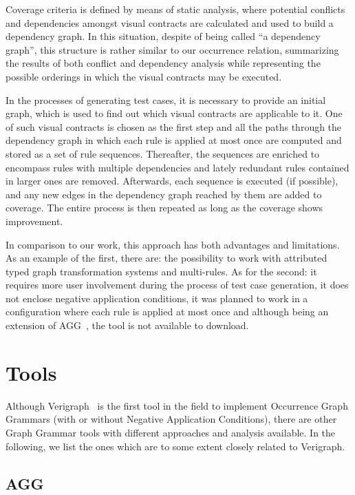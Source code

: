 Coverage criteria is defined by means of static analysis, where potential conflicts and dependencies amongst visual contracts are calculated and used to build a dependency graph. In this situation, despite of being called ``a dependency graph'', this structure is rather similar to our occurrence relation, summarizing the results of both conflict and dependency analysis while representing the possible orderings in which the visual contracts may be executed.

In the processes of generating test cases, it is necessary to provide an initial graph, which is used to find out which visual contracts are applicable to it. One of such visual contracts is chosen as the first step and all the paths through the dependency graph in which each rule is applied at most once are computed and stored as a set of rule sequences. Thereafter, the sequences are enriched to encompass rules with multiple dependencies and lately redundant rules contained in larger ones are
removed. Afterwards, each sequence is executed (if possible), and any new edges in the dependency graph reached by them are added to coverage. The entire process is then repeated as long as the coverage shows improvement.

In comparison to our work, this approach has both advantages and limitations. As an example of the first, there are: the possibility to work with attributed typed graph transformation systems and multi-rules. As for the second: it requires more user involvement during the process of test case generation, it does not enclose negative application conditions, it was planned to work in a configuration where each rule is applied at most once and although being an extension of
AGG~\cite{Taentzer2000}, the tool is not available to download.

\section{Tools}

Although Verigraph~\cite{Costa2016, verigraph, Azzi2018} is the first tool in the field to implement Occurrence Graph Grammars (with or without Negative Application Conditions), there are other Graph Grammar tools with different approaches and analysis available. In the following, we list the ones which are to some extent closely related to Verigraph.

\subsection{AGG}

